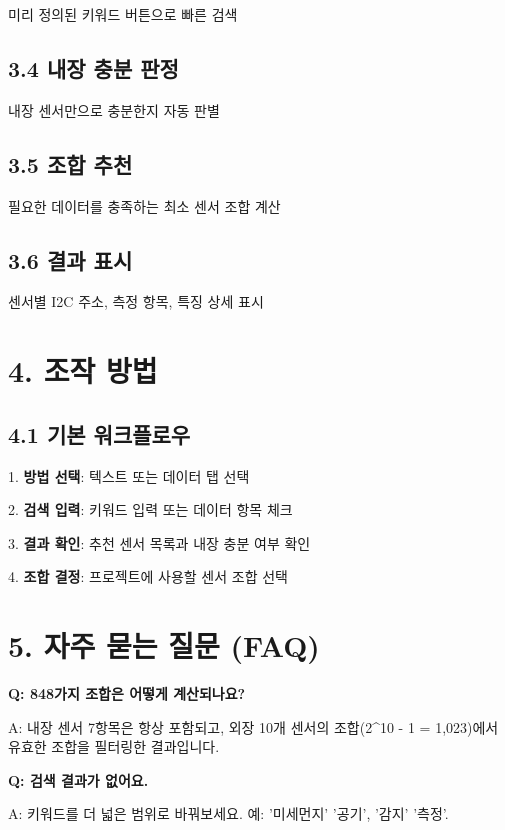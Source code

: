 \documentclass[11pt,a4paper]{article}
\begin{document}
미리 정의된 키워드 버튼으로 빠른 검색


\subsection*{3.4 내장 충분 판정}

내장 센서만으로 충분한지 자동 판별


\subsection*{3.5 조합 추천}

필요한 데이터를 충족하는 최소 센서 조합 계산


\subsection*{3.6 결과 표시}

센서별 I2C 주소, 측정 항목, 특징 상세 표시



\section*{4. 조작 방법}

\subsection*{4.1 기본 워크플로우}

1. \textbf{방법 선택}:  텍스트 또는  데이터 탭 선택

2. \textbf{검색 입력}: 키워드 입력 또는 데이터 항목 체크

3. \textbf{결과 확인}: 추천 센서 목록과 내장 충분 여부 확인

4. \textbf{조합 결정}: 프로젝트에 사용할 센서 조합 선택



\section*{5. 자주 묻는 질문 (FAQ)}

\textbf{Q: 848가지 조합은 어떻게 계산되나요?}


A: 내장 센서 7항목은 항상 포함되고, 외장 10개 센서의 조합(2\textasciicircum{}10 - 1 = 1,023)에서 유효한 조합을 필터링한 결과입니다.


\textbf{Q: 검색 결과가 없어요.}


A: 키워드를 더 넓은 범위로 바꿔보세요. 예: '미세먼지' \textrightarrow{} '공기', '감지' \textrightarrow{} '측정'.
\end{document}
